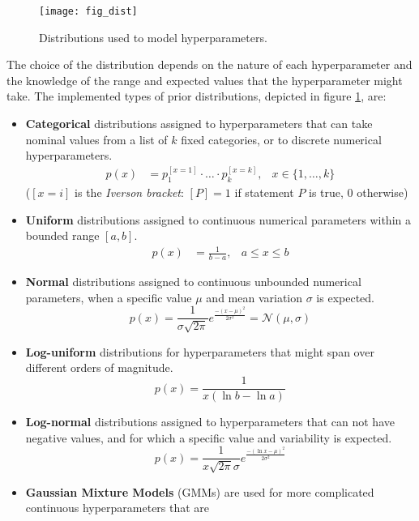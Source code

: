 	\begin{figure}[t]
		\texttt{[image: fig\_dist]}
		\caption[Distributions used to model hyperparameters]{Distributions used to model
		hyperparameters.}
		\label{img:distributions}
	\end{figure}

	The choice of the distribution depends on the nature of each hyperparameter and the knowledge of the
	range and expected values that the hyperparameter might take. The implemented types of prior
	distributions, depicted in figure \ref{img:distributions}, are:
	\begin{itemize}
		\item {\bf Categorical} distributions assigned to hyperparameters that can take nominal values
		from a list of $k$ fixed categories, or to discrete numerical hyperparameters.
		\begin{align}
			p(x) &= p_1^{[x=1]}\cdot \ldots \cdot p_k^{[x=k]}, & x \in \{1,\ldots,k\}
		\end{align}
		($[x=i]$ is the \emph{Iverson bracket}: $[P] = 1$ if statement $P$ is true, $0$ otherwise)
		\item {\bf Uniform} distributions assigned to continuous numerical parameters within a
		bounded range $[a,b]$.
		\begin{align}
			p(x) &= \frac 1 {b - a}, & a \leq x \leq b
		\end{align}
		\item {\bf Normal} distributions assigned to continuous unbounded numerical parameters, when
		a specific value $\mu$ and mean variation $\sigma$ is expected.
		\begin{equation}
			p(x) = \frac 1 {\sigma \sqrt{2\pi}} e^ \frac {-(x - \mu)^2} {2 \sigma^2} =
			\mathcal{N}(\mu, \sigma)
		\end{equation}
		\item {\bf Log-uniform} distributions for hyperparameters that might span over different
		orders of magnitude.
		\begin{equation}
			p(x) = \frac 1 {x(\ln b - \ln a)}
		\end{equation}
		\item {\bf Log-normal} distributions assigned to hyperparameters that can not have negative
		values, and for which a specific value and variability is expected.
		\begin{equation}
			p(x) = \frac 1 {x\sqrt{2\pi}\sigma} e^ \frac{-(\ln x - \mu)^2} {2\sigma^2}
		\end{equation}
		\item {\bf Gaussian Mixture Models} (GMMs) are used for more complicated continuous hyperparameters that are

\end{itemize}
